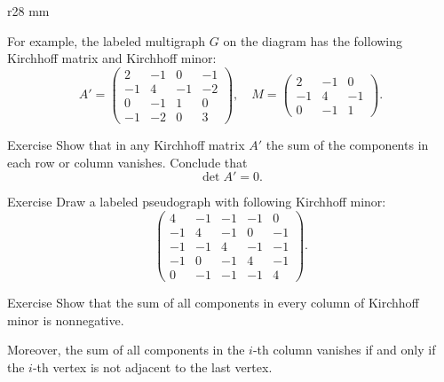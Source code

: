 {

\begin{wrapfigure}{r}{28 mm}
\vskip-4mm
\end{wrapfigure}

For example, the labeled multigraph $G$ on the diagram has the following Kirchhoff matrix and Kirchhoff minor:
\[A'=\left(
\begin{matrix}
2&-1&0&-1
\\
-1&4&-1&-2
\\
0&-1&1&0
\\
-1&-2&0&3
\end{matrix}
\right),
\quad 
M=\left(
\begin{matrix}
2&-1&0
\\
-1&4&-1
\\
0&-1&1
\end{matrix}
\right).\]

}

\begin{thm}{Exercise}
Show that in any Kirchhoff matrix $A'$ the sum of the components in each row or column vanishes.
Conclude that 
\[\det A'=0.\]

\end{thm}

\begin{thm}{Exercise}
Draw a labeled pseudograph with following Kirchhoff minor:
\[\left(
\begin{matrix}
4&-1&-1&-1&0
\\
-1&4&-1&0&-1
\\
-1&-1&4&-1&-1
\\
-1&0&-1&4&-1
\\
0&-1&-1&-1&4
\end{matrix}
\right).\]
\end{thm}

\begin{thm}{Exercise}\label{ex:sum-kirchhoff}
Show that the sum of all components in every column of Kirchhoff minor is nonnegative.

Moreover, the sum of all components in the $i$-th column vanishes if and only if the $i$-th vertex is not adjacent to the last vertex.
\end{thm}



